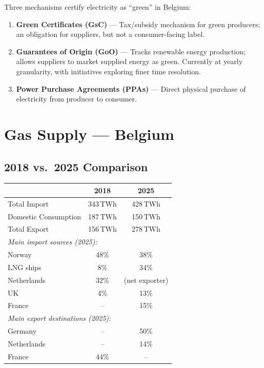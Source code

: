 Three mechanisms certify electricity as ``green'' in Belgium:

\begin{enumerate}[noitemsep]
    \item \textbf{Green Certificates (GsC)} — Tax/subsidy mechanism for green producers; an obligation for suppliers, but not a consumer-facing label.
    \item \textbf{Guarantees of Origin (GoO)} — Tracks renewable energy production; allows suppliers to market supplied energy as green. Currently at yearly granularity, with initiatives exploring finer time resolution.
    \item \textbf{Power Purchase Agreements (PPAs)} — Direct physical purchase of electricity from producer to consumer.
\end{enumerate}

\section{Gas Supply — Belgium}

\subsection*{2018 vs.\ 2025 Comparison}

\begin{center}
\begin{tabular}{lcc}
\toprule
 & \textbf{2018} & \textbf{2025} \\
\midrule
Total Import & 343\,TWh & 428\,TWh \\
Domestic Consumption & 187\,TWh & 150\,TWh \\
Total Export & 156\,TWh & 278\,TWh \\
\midrule
\multicolumn{3}{l}{\textit{Main import sources (2025):}} \\
Norway & 48\% & 38\% \\
LNG ships & 8\% & 34\% \\
Netherlands & 32\% & (net exporter) \\
UK & 4\% & 13\% \\
France & -- & 15\% \\
\midrule
\multicolumn{3}{l}{\textit{Main export destinations (2025):}} \\
Germany & -- & 50\% \\
Netherlands & -- & 14\% \\
France & 44\% & -- \\
\bottomrule
\end{tabular}
\end{center}

